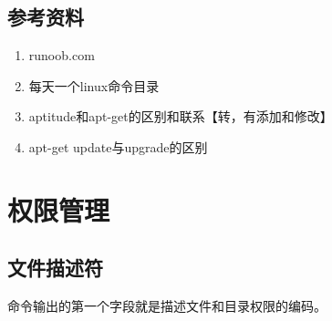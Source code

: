 \documentclass[letterpaper,10pt,english]{sphinxmanual}
\begin{document}
\subsection{参考资料}
\label{\detokenize{linux/02_more:id3}}\begin{enumerate}
\item {} 
runoob.com

\end{enumerate}
\begin{quote}


\end{quote}
\begin{enumerate}
\setcounter{enumi}{1}
\item {} 
每天一个linux命令目录

\end{enumerate}
\begin{quote}

\end{quote}
\begin{enumerate}
\setcounter{enumi}{2}
\item {} 
aptitude和apt-get的区别和联系【转，有添加和修改】

\end{enumerate}
\begin{quote}

\end{quote}
\begin{enumerate}
\setcounter{enumi}{3}
\item {} 
apt-get update与upgrade的区别

\end{enumerate}
\begin{quote}

\end{quote}


\section{权限管理}
\label{\detokenize{linux/03_authority::doc}}\label{\detokenize{linux/03_authority:id1}}

\subsection{文件描述符}
\label{\detokenize{linux/03_authority:id2}}
 命令输出的第一个字段就是描述文件和目录权限的编码。
\end{document}
